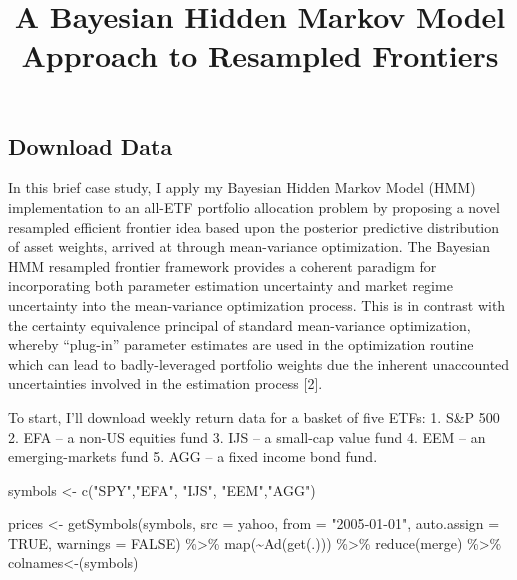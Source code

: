 \documentclass[
]{article}
\title{A Bayesian Hidden Markov Model Approach to Resampled Frontiers}
\author{}
\date{\vspace{-2.5em}}
\newenvironment{Shaded}{\begin{snugshade}}{\end{snugshade}}
\newcommand{\AttributeTok}[1]{\textcolor[rgb]{0.77,0.63,0.00}{#1}}
\newcommand{\ConstantTok}[1]{\textcolor[rgb]{0.00,0.00,0.00}{#1}}
\newcommand{\FunctionTok}[1]{\textcolor[rgb]{0.00,0.00,0.00}{#1}}
\newcommand{\NormalTok}[1]{#1}
\newcommand{\OtherTok}[1]{\textcolor[rgb]{0.56,0.35,0.01}{#1}}
\newcommand{\SpecialCharTok}[1]{\textcolor[rgb]{0.00,0.00,0.00}{#1}}
\newcommand{\StringTok}[1]{\textcolor[rgb]{0.31,0.60,0.02}{#1}}
\begin{document}
\maketitle

\hypertarget{download-data}{%
\subsection{Download Data}\label{download-data}}

In this brief case study, I apply my Bayesian Hidden Markov Model (HMM)
implementation to an all-ETF portfolio allocation problem by proposing a
novel resampled efficient frontier idea based upon the posterior
predictive distribution of asset weights, arrived at through
mean-variance optimization. The Bayesian HMM resampled frontier
framework provides a coherent paradigm for incorporating both parameter
estimation uncertainty and market regime uncertainty into the
mean-variance optimization process. This is in contrast with the
certainty equivalence principal of standard mean-variance optimization,
whereby ``plug-in'' parameter estimates are used in the optimization
routine which can lead to badly-leveraged portfolio weights due the
inherent unaccounted uncertainties involved in the estimation process
{[}2{]}.

To start, I'll download weekly return data for a basket of five ETFs: 1.
S\&P 500 2. EFA -- a non-US equities fund 3. IJS -- a small-cap value
fund 4. EEM -- an emerging-markets fund 5. AGG -- a fixed income bond
fund.

\begin{Shaded}
\begin{Highlighting}[]
\NormalTok{symbols }\OtherTok{\textless{}{-}} \FunctionTok{c}\NormalTok{(}\StringTok{"SPY"}\NormalTok{,}\StringTok{"EFA"}\NormalTok{, }\StringTok{"IJS"}\NormalTok{, }\StringTok{"EEM"}\NormalTok{,}\StringTok{"AGG"}\NormalTok{)}

\NormalTok{prices }\OtherTok{\textless{}{-}} \FunctionTok{getSymbols}\NormalTok{(symbols, }\AttributeTok{src =} \StringTok{\textquotesingle{}yahoo\textquotesingle{}}\NormalTok{, }\AttributeTok{from =} \StringTok{"2005{-}01{-}01"}\NormalTok{,}
             \AttributeTok{auto.assign =} \ConstantTok{TRUE}\NormalTok{, }\AttributeTok{warnings =} \ConstantTok{FALSE}\NormalTok{) }\SpecialCharTok{\%\textgreater{}\%}
  \FunctionTok{map}\NormalTok{(}\SpecialCharTok{\textasciitilde{}}\FunctionTok{Ad}\NormalTok{(}\FunctionTok{get}\NormalTok{(.))) }\SpecialCharTok{\%\textgreater{}\%}
  \FunctionTok{reduce}\NormalTok{(merge) }\SpecialCharTok{\%\textgreater{}\%}
  \StringTok{\textasciigrave{}}\AttributeTok{colnames\textless{}{-}}\StringTok{\textasciigrave{}}\NormalTok{(symbols)}
\end{Highlighting}
\end{Shaded}
\end{document}
